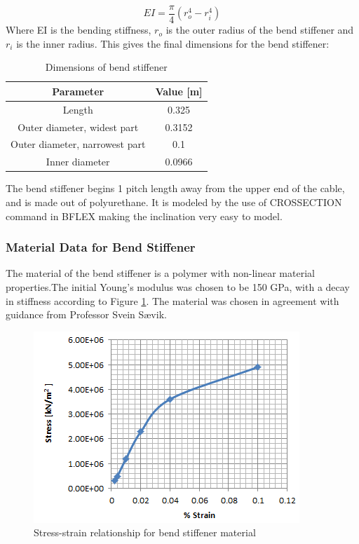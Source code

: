  \begin{equation}
  EI = \frac{\pi}{4}(r_o^4 - r_i^4) 
\end{equation}
 Where EI is the bending stiffness, $r_o$ is the outer radius of the bend stiffener and $r_i$ is the inner radius.\newline 
\newline 
This gives the final dimensions for the bend stiffener: 
 \begin{table} [H]
\centering
\begin{tabular}{ |c|c|}
\hline
Parameter & Value [m] \\
 \hline
 \hline
 
 Length & 0.325 \\
 
Outer diameter, widest part & 0.3152\\

Outer diameter, narrowest part & 0.1\\

 Inner diameter & 0.0966 \\
 

 \hline
\end{tabular}
\caption{Dimensions of bend stiffener}
\label{table:dim}
\end{table}
\noindent The bend stiffener begins 1 pitch length away from the upper end of the cable, and is made out of polyurethane. It is modeled by the use of CROSSECTION command in BFLEX making the inclination very easy to model.  

\subsubsection{Material Data for Bend Stiffener}
The material of the bend stiffener is a polymer with non-linear material properties.The initial Young's modulus was chosen to be 150 GPa, with a decay in stiffness according to  Figure \ref{fig:matbend}. The material was chosen in agreement with guidance from Professor Svein Sævik. 

\begin{figure}[H]
\centering
\includegraphics[scale=0.8]{figures/matbend}
\caption[$\; \:$ Stress-strain relationship for bend stiffener material]{Stress-strain relationship for bend stiffener material}
 \label{fig:matbend}
\end{figure}

